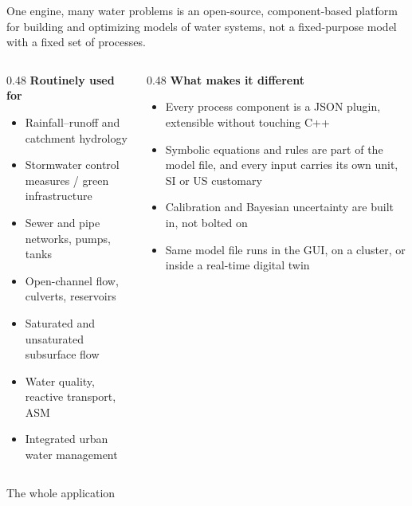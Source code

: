 \documentclass[aspectratio=169, 10pt]{beamer}
\begin{document}
\begin{frame}{One engine, many water problems}
  \ohq{} is an \alert{open-source, component-based} platform for building and
  optimizing models of water systems, not a fixed-purpose model with a fixed
  set of processes.

  \vspace{0.4em}
  \begin{columns}[T,onlytextwidth]
    \begin{column}{0.48\textwidth}
      \textbf{Routinely used for}
      \begin{itemize}\setlength\itemsep{1pt}
        \item Rainfall--runoff and catchment hydrology
        \item Stormwater control measures / green infrastructure
        \item Sewer and pipe networks, pumps, tanks
        \item Open-channel flow, culverts, reservoirs
        \item Saturated and unsaturated subsurface flow
        \item Water quality, reactive transport, ASM
        \item Integrated urban water management
      \end{itemize}
    \end{column}
    \begin{column}{0.48\textwidth}
      \textbf{What makes it different}
      \begin{itemize}\setlength\itemsep{1pt}
        \item Every process component is a \alert{JSON plugin}, extensible
              without touching C++
        \item Symbolic equations and rules are part of the model file, and
              every input carries its own unit, SI or US customary
        \item Calibration and Bayesian uncertainty are \alert{built in}, not bolted on
        \item Same model file runs in the GUI, on a cluster, or inside a
              real-time digital twin
      \end{itemize}
    \end{column}
  \end{columns}
\end{frame}

\begin{frame}{The whole application}
  \setlength{\figslotmaxht}{0.86\textheight}
\end{frame}
\end{document}
